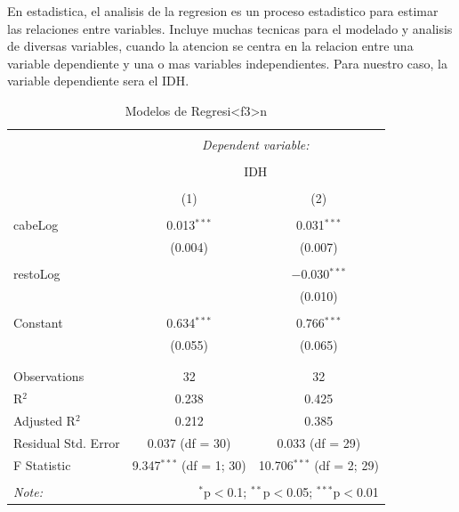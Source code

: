 \documentclass{article}
\begin{document}
En estadistica, el analisis de la regresion es un proceso estadistico para estimar las relaciones entre variables. Incluye muchas tecnicas para el modelado y analisis de diversas variables, cuando la atencion se centra en la relacion entre una variable dependiente y una o mas variables independientes. Para nuestro caso, la variable dependiente sera el IDH.  

\begin{table}[!htbp] \centering 
  \caption{Modelos de Regresi<f3>n} 
  \label{regresiones} 
\begin{tabular}{@{\extracolsep{5pt}}lcc} 
\\[-1.8ex]\hline 
\hline \\[-1.8ex] 
 & \multicolumn{2}{c}{\textit{Dependent variable:}} \\ 
\cline{2-3} 
\\[-1.8ex] & \multicolumn{2}{c}{IDH} \\ 
\\[-1.8ex] & (1) & (2)\\ 
\hline \\[-1.8ex] 
 cabeLog & 0.013$^{***}$ & 0.031$^{***}$ \\ 
  & (0.004) & (0.007) \\ 
  & & \\ 
 restoLog &  & $-$0.030$^{***}$ \\ 
  &  & (0.010) \\ 
  & & \\ 
 Constant & 0.634$^{***}$ & 0.766$^{***}$ \\ 
  & (0.055) & (0.065) \\ 
  & & \\ 
\hline \\[-1.8ex] 
Observations & 32 & 32 \\ 
R$^{2}$ & 0.238 & 0.425 \\ 
Adjusted R$^{2}$ & 0.212 & 0.385 \\ 
Residual Std. Error & 0.037 (df = 30) & 0.033 (df = 29) \\ 
F Statistic & 9.347$^{***}$ (df = 1; 30) & 10.706$^{***}$ (df = 2; 29) \\ 
\hline 
\hline \\[-1.8ex] 
\textit{Note:}  & \multicolumn{2}{r}{$^{*}$p$<$0.1; $^{**}$p$<$0.05; $^{***}$p$<$0.01} \\ 
\end{tabular} 
\end{table} 
\end{document}
